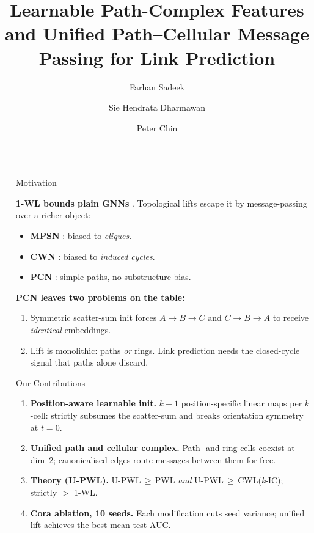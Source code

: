 \documentclass[final]{beamer}
\title{Learnable Path-Complex Features and Unified Path--Cellular Message Passing for Link Prediction}
\author{Farhan Sadeek \and Sie Hendrata Dharmawan \and Peter Chin}
\institute{}
\newlength{\colwidth}
\newlength{\marginwidth}
\newcommand{\marginspacer}{
  \begin{column}{\marginwidth}
\end{column}}
\begin{document}
\begin{frame}[t]
  \begin{columns}[t]
    \marginspacer

    \begin{column}{\colwidth}

      \begin{block}{Motivation}

        \textbf{1-WL bounds plain GNNs} \citep{xu_how_2019}. Topological
        lifts escape it by message-passing over a richer object:
      \begin{itemize}\setlength{\itemsep}{0.15em}
          \item \textbf{MPSN} \citep{bodnar_weisfeiler_2021}: biased to \emph{cliques}.
          \item \textbf{CWN} \citep{bodnar_weisfeiler_2022}: biased to \emph{induced cycles}.
          \item \textbf{PCN} \citep{truong_weisfeiler_2024}: simple paths, no substructure bias.
        \end{itemize}

        \medskip
        \textbf{PCN leaves two problems on the table:}
      \begin{enumerate}\setlength{\itemsep}{0.15em}
          \item Symmetric scatter-sum init forces
            $A{\to}B{\to}C$ and $C{\to}B{\to}A$ to receive \emph{identical}
            embeddings.
          \item Lift is monolithic: paths \emph{or} rings.
            Link prediction needs the closed-cycle signal that paths
            alone discard.
        \end{enumerate}

      \end{block}

      \medskip

      \begin{alertblock}{Our Contributions}

      \begin{enumerate}\setlength{\itemsep}{0.2em}
          \item \textbf{Position-aware learnable init.} $k{+}1$ position-specific
            linear maps per $k$-cell: strictly subsumes the scatter-sum
            and breaks orientation symmetry at $t{=}0$.
          \item \textbf{Unified path and cellular complex.} Path- and ring-cells
            coexist at dim~2; canonicalised edges route messages between
            them for free.
          \item \textbf{Theory (U-PWL).} U-PWL\,$\geq$\,PWL \emph{and} U-PWL\,$\geq$\,CWL(\textit{k}-IC); strictly $>$ 1-WL.
          \item \textbf{Cora ablation, 10 seeds.} Each modification cuts seed
            variance; unified lift achieves the best mean test AUC.
        \end{enumerate}


\end{alertblock}
\end{column}
\end{columns}
\end{frame}
\end{document}
